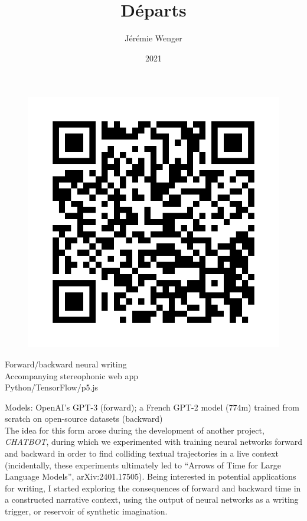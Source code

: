 \documentclass[
  extrafontsizes,
  oneside,
  14pt
]{memoir}
\title{\Huge{Départs}}
\author{Jérémie Wenger}
\date{2021}
\begin{document}
\maketitle

\begin{figure}[h]
  \centering
  \includegraphics{qr}
\end{figure}

\vfill

\noindent Forward/backward neural writing\\
Accompanying stereophonic web app
\\

\noindent Python/TensorFlow/p5.js

\noindent Models: OpenAI's GPT-3 (forward); a French GPT-2 model (774m) trained
from scratch on open-source datasets (backward)
\\

\noindent The idea for this form arose during the development of another
project, \emph{CHATBOT}, during which we experimented with training neural
networks forward and backward in order to find colliding textual trajectories
in a live context (incidentally, these experiments ultimately led to ``Arrows
of Time for Large Language Models'', arXiv:2401.17505). Being interested in
potential applications for writing, I started exploring the consequences of
forward and backward time in a constructed narrative context, using the output
of neural networks as a writing trigger, or reservoir of synthetic imagination.
\end{document}
